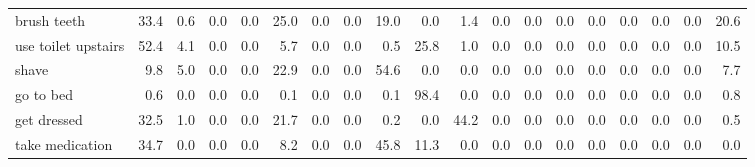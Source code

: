 \documentclass{article}
\begin{document}
\begin{sideways}
\begin{tabular}{lrrrrrrrrrrrrrrrrrr}
brush teeth                   &        33.4 &                0.6 &           0.0 &                          0.0 &               25.0 &                0.0 &                        0.0 &         19.0 &              0.0 &                1.4 &                    0.0 &                      0.0 &                  0.0 &                   0.0 &              0.0 &              0.0 &                                  0.0 &         20.6 \\
use toilet upstairs           &        52.4 &                4.1 &           0.0 &                          0.0 &                5.7 &                0.0 &                        0.0 &          0.5 &             25.8 &                1.0 &                    0.0 &                      0.0 &                  0.0 &                   0.0 &              0.0 &              0.0 &                                  0.0 &         10.5 \\
shave                         &         9.8 &                5.0 &           0.0 &                          0.0 &               22.9 &                0.0 &                        0.0 &         54.6 &              0.0 &                0.0 &                    0.0 &                      0.0 &                  0.0 &                   0.0 &              0.0 &              0.0 &                                  0.0 &          7.7 \\
go to bed                     &         0.6 &                0.0 &           0.0 &                          0.0 &                0.1 &                0.0 &                        0.0 &          0.1 &             98.4 &                0.0 &                    0.0 &                      0.0 &                  0.0 &                   0.0 &              0.0 &              0.0 &                                  0.0 &          0.8 \\
get dressed                   &        32.5 &                1.0 &           0.0 &                          0.0 &               21.7 &                0.0 &                        0.0 &          0.2 &              0.0 &               44.2 &                    0.0 &                      0.0 &                  0.0 &                   0.0 &              0.0 &              0.0 &                                  0.0 &          0.5 \\
take medication               &        34.7 &                0.0 &           0.0 &                          0.0 &                8.2 &                0.0 &                        0.0 &         45.8 &             11.3 &                0.0 &                    0.0 &                      0.0 &                  0.0 &                   0.0 &              0.0 &              0.0 &                                  0.0 &          0.0 \\

\end{tabular}
\end{sideways}
\end{document}
